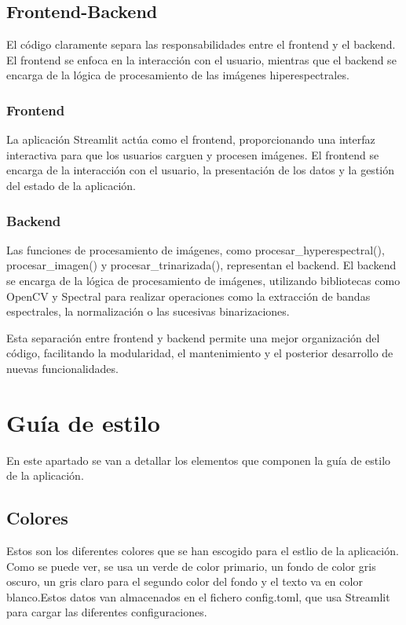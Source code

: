 
\subsection{Frontend-Backend}

El código claramente separa las responsabilidades entre el frontend y el backend. El frontend se enfoca en la interacción con el usuario, mientras que el backend se encarga de la lógica de procesamiento de las imágenes hiperespectrales.

\subsubsection{Frontend}
La aplicación Streamlit actúa como el frontend, proporcionando una interfaz interactiva para que los usuarios carguen y procesen imágenes. El frontend se encarga de la interacción con el usuario, la presentación de los datos y la gestión del estado de la aplicación.

\subsubsection{Backend}
Las funciones de procesamiento de imágenes, como procesar\_hyperespectral(), procesar\_imagen() y procesar\_trinarizada(), representan el backend. El backend se encarga de la lógica de procesamiento de imágenes, utilizando bibliotecas como OpenCV y Spectral para realizar operaciones como la extracción de bandas espectrales, la normalización o las sucesivas binarizaciones.

Esta separación entre frontend y backend permite una mejor organización del código, facilitando la modularidad, el mantenimiento y el posterior desarrollo de nuevas funcionalidades.

\section{Guía de estilo}
En este apartado se van a detallar los elementos que componen la guía de estilo de la aplicación.

\subsection{Colores}
Estos son los diferentes colores que se han escogido para el estlio de la aplicación. Como se puede ver, se usa un verde de color primario, un fondo de color gris oscuro, un gris claro para el segundo color del fondo y el texto va en color blanco.Estos datos van almacenados en el fichero config.toml, que usa Streamlit para cargar las diferentes configuraciones.

